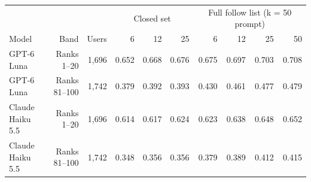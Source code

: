 \begin{tabular}{lrrrrrrrrr}
\toprule
 &  &  & \multicolumn{3}{c}{Closed set} & \multicolumn{4}{c}{Full follow list (k = 50 prompt)} \\
Model & Band & Users & 6 & 12 & 25 & 6 & 12 & 25 & 50 \\
\midrule
GPT-6 Luna & Ranks 1--20 & 1,696 & 0.652 & 0.668 & 0.676 & 0.675 & 0.697 & 0.703 & 0.708 \\
GPT-6 Luna & Ranks 81--100 & 1,742 & 0.379 & 0.392 & 0.393 & 0.430 & 0.461 & 0.477 & 0.479 \\
Claude Haiku 5.5 & Ranks 1--20 & 1,696 & 0.614 & 0.617 & 0.624 & 0.623 & 0.638 & 0.648 & 0.652 \\
Claude Haiku 5.5 & Ranks 81--100 & 1,742 & 0.348 & 0.356 & 0.356 & 0.379 & 0.389 & 0.412 & 0.415 \\
\bottomrule
\end{tabular}
